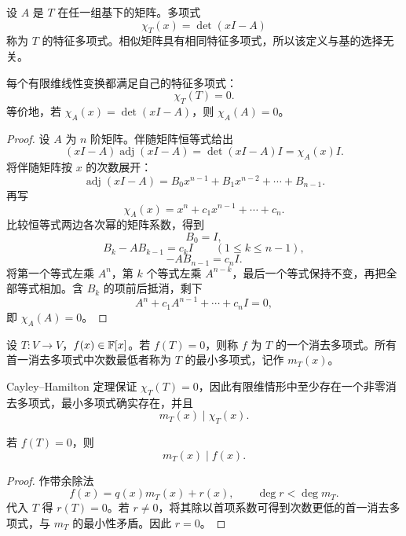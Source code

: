 \begin{definition}[特征多项式]
设 $A$ 是 $T$ 在任一组基下的矩阵。多项式
\[
\chi_T(x)=\det(xI-A)
\]
称为 $T$ 的特征多项式。相似矩阵具有相同特征多项式，所以该定义与基的选择无关。
\end{definition}

\begin{theorem}
每个有限维线性变换都满足自己的特征多项式：
\[
\chi_T(T)=0.
\]
等价地，若 $\chi_A(x)=\det(xI-A)$，则 $\chi_A(A)=0$。
\end{theorem}
\begin{proof}
设 $A$ 为 $n$ 阶矩阵。伴随矩阵恒等式给出
\[
(xI-A)\operatorname{adj}(xI-A)
=\det(xI-A)I
=\chi_A(x)I.
\]
将伴随矩阵按 $x$ 的次数展开：
\[
\operatorname{adj}(xI-A)
=B_0x^{n-1}+B_1x^{n-2}+\cdots+B_{n-1}.
\]
再写
\[
\chi_A(x)=x^n+c_1x^{n-1}+\cdots+c_n.
\]
比较恒等式两边各次幂的矩阵系数，得到
\[
B_0=I,
\]
\[
B_k-AB_{k-1}=c_kI\qquad(1\le k\le n-1),
\]
\[
-AB_{n-1}=c_nI.
\]
将第一个等式左乘 $A^n$，第 $k$ 个等式左乘 $A^{n-k}$，最后一个等式保持不变，再把全部等式相加。含 $B_k$ 的项前后抵消，剩下
\[
A^n+c_1A^{n-1}+\cdots+c_nI=0,
\]
即 $\chi_A(A)=0$。
\end{proof}

\begin{definition}[消去多项式与最小多项式]
设 $T:V\to V$，$f(x)\in\mathbb{F}[x]$。若 $f(T)=0$，则称 $f$ 为 $T$ 的一个消去多项式。所有首一消去多项式中次数最低者称为 $T$ 的最小多项式，记作 $m_T(x)$。
\end{definition}

\begin{remark}
Cayley--Hamilton 定理保证 $\chi_T(T)=0$，因此有限维情形中至少存在一个非零消去多项式，最小多项式确实存在，并且
\[
m_T(x)\mid\chi_T(x).
\]
\end{remark}

\begin{proposition}[最小多项式整除所有消去多项式]
若 $f(T)=0$，则
\[
m_T(x)\mid f(x).
\]
\end{proposition}
\begin{proof}
作带余除法
\[
f(x)=q(x)m_T(x)+r(x),
\qquad
\deg r<\deg m_T.
\]
代入 $T$ 得 $r(T)=0$。若 $r\ne0$，将其除以首项系数可得到次数更低的首一消去多项式，与 $m_T$ 的最小性矛盾。因此 $r=0$。
\end{proof}


